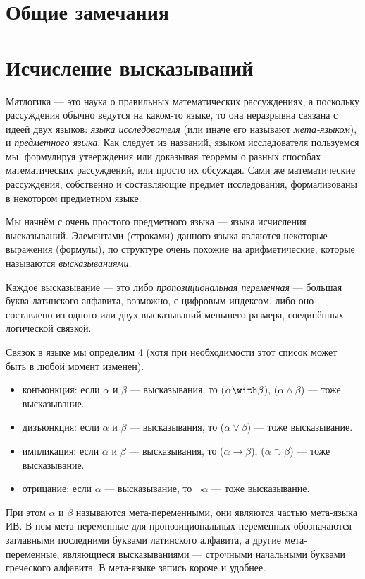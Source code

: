 \section{Общие замечания}

\section{Исчисление высказываний}

Матлогика --- это наука о правильных математических рассуждениях, а поскольку
рассуждения обычно ведутся на каком-то языке, то она неразрывна связана с идеей
двух языков: \emph{языка исследователя} (или иначе его называют \emph{мета-языком}),
и \emph{предметного языка}. Как следует из названий, языком исследователя 
пользуемся мы, формулируя утверждения или доказывая теоремы о разных способах
математических рассуждений, или просто их обсуждая. Сами же математические рассуждения,
собственно и составляющие предмет исследования, формализованы в некотором предметном 
языке.

Мы начнём с очень простого предметного языка --- языка исчисления высказываний.
Элементами (строками) данного языка являются некоторые выражения (формулы), по структуре
очень похожие на арифметические, которые называются \emph{высказываниями}.

Каждое высказывание --- это либо \emph{пропозициональная переменная} --- 
большая буква латинского алфавита, возможно, с цифровым индексом, либо 
оно составлено из одного или двух высказываний меньшего размера, соединённых логической связкой.

Связок в языке мы определим 4 (хотя при необходимости этот список может быть
в любой момент изменен).
\begin{itemize}
\item конъюнкция: если $\alpha$ и $\beta$ --- высказывания, то ($\alpha \with
  \beta$), ($\alpha \land \beta$) --- тоже высказывание.
\item дизъюнкция: если $\alpha$ и $\beta$ --- высказывания, то ($\alpha \vee
  \beta$) --- тоже высказывание.
\item импликация: если $\alpha$ и $\beta$ --- высказывания, то ($\alpha
  \rightarrow \beta$), ($\alpha \supset \beta$) --- тоже высказывание.
\item отрицание: если $\alpha$ --- высказывание, то $\neg\alpha$ --- тоже высказывание.
\end{itemize}

При этом $\alpha$ и $\beta$ называются мета-переменными, они являются частью
мета-языка ИВ. В нем мета-переменные для пропозициональных переменных
обозначаются заглавными последними буквами латинского алфавита, а другие
мета-переменные, являющиеся высказываниями --- строчными начальными буквами греческого алфавита. В мета-языке
запись короче и удобнее.

